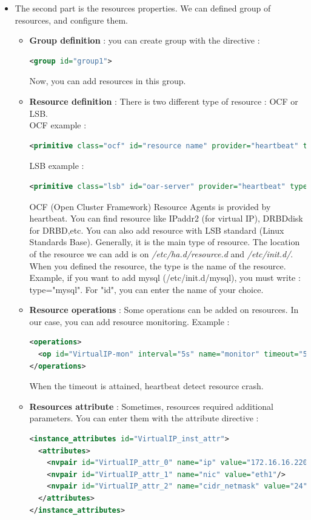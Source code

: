 \documentclass[a4paper,10pt]{report}
\begin{document}
\begin{itemize}
\item The second part is the resources properties. We can defined group of resources, and configure them.

\begin{itemize}
\item \textbf{Group definition} : you can create group with the directive :
\begin{lstlisting}[language=xml]
<group id="group1">
\end{lstlisting}
Now, you can add resources in this group.
\item \textbf{Resource definition} : There is two different type of resource : OCF or LSB.\\
OCF example : 
\begin{lstlisting}[language=xml]
<primitive class="ocf" id="resource name" provider="heartbeat" type="resource-name">
\end{lstlisting}
LSB example : 
\begin{lstlisting}[language=xml]
<primitive class="lsb" id="oar-server" provider="heartbeat" type="oar-server">
\end{lstlisting}
OCF (Open Cluster Framework) Resource Agents is provided by heartbeat. You can find resource like IPaddr2 (for virtual IP), DRBDdisk for DRBD,etc.
You can also add resource with LSB standard (Linux Standards Base). Generally, it is the main type of resource. The location of the resource we can add is on \textit{/etc/ha.d/resource.d} and \textit{/etc/init.d/}.
When you defined the resource, the type is the name of the resource. Example, if you want to add mysql (/etc/init.d/mysql), you must write : type="mysql". For "id", you can enter the name of your choice.
\item \textbf{Resource operations} : Some operations can be added on resources. In our case, you can add resource monitoring. Example :
\begin{lstlisting}[language=xml]
<operations>
  <op id="VirtualIP-mon" interval="5s" name="monitor" timeout="5s"/>
</operations>
\end{lstlisting}
When the timeout is attained, heartbeat detect resource crash.
\item \textbf{Resources attribute} : Sometimes, resources required additional parameters. You can enter them with the attribute directive :
\begin{lstlisting}[language=xml]
<instance_attributes id="VirtualIP_inst_attr">
  <attributes>
    <nvpair id="VirtualIP_attr_0" name="ip" value="172.16.16.220"/>
    <nvpair id="VirtualIP_attr_1" name="nic" value="eth1"/>
    <nvpair id="VirtualIP_attr_2" name="cidr_netmask" value="24"/>
  </attributes>
</instance_attributes>
\end{lstlisting}


\end{itemize}
\end{itemize}
\end{document}
